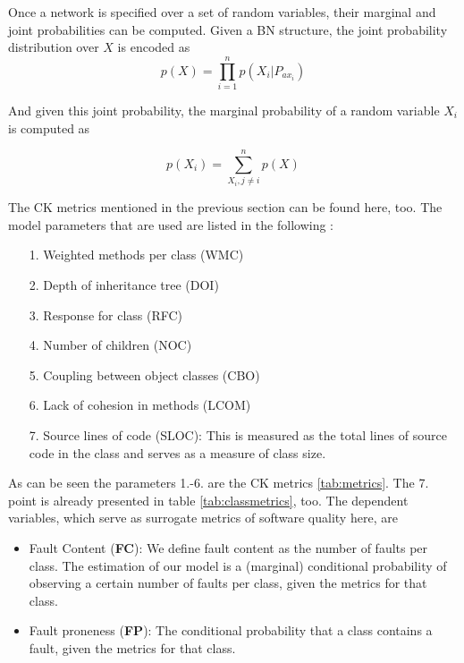 Once a network is specified over a set of random variables, their marginal and joint probabilities can be computed.
Given a BN structure, the joint probability distribution over $X$ is encoded as
\begin{displaymath}
	p(X)= \prod_{i=1}^{n}p(X_i|P_{ax_i})
\end{displaymath}

And given this joint probability, the marginal probability of a random variable $X_i$ is computed as 

\begin{displaymath}
	p(X_i)= \sum_{X_i,j\neq i}^{n}p(X)
\end{displaymath}

The CK metrics mentioned in the previous section can be found here, too. The model parameters that are used are listed in the following \cite{b9pai2007empirical}: 

\begin{itemize}
	\item[1.] Weighted methods per class (WMC)
	\item[2.] Depth of inheritance tree (DOI)
	\item[3.] Response for class (RFC)
	\item[4.] Number of children (NOC)
	\item[5.] Coupling between object classes (CBO)
	\item[6.] Lack of cohesion in methods (LCOM)
	\item[7.] Source lines of code (SLOC): This is measured as the total lines of source code in the class and serves as a measure of class size.
\end{itemize}

As can be seen the parameters 1.-6. are the CK metrics \ref{tab:metrics}. The 7. point is already presented in table \ref{tab:classmetrics}, too.
The dependent variables, which serve as surrogate metrics of software quality here, are
\begin{itemize}
	\item Fault Content (\textbf{FC}): We define fault content as the number of faults per class. The estimation of our model is a (marginal) conditional probability of observing a certain number of faults per class, given the metrics for that class.
	\item Fault proneness (\textbf{FP}): The conditional probability that a class contains a fault, given the metrics for that class.
\end{itemize}

